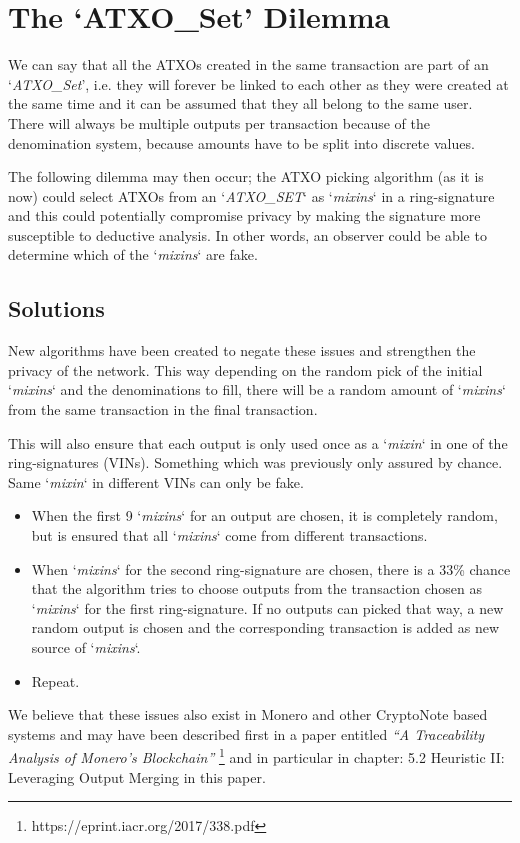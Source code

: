 \section{The ‘ATXO\_Set’ Dilemma}

We can say that all the ATXOs created in the same transaction are part 
of an ‘\textit{ATXO\_Set}’, i.e. they will forever be linked to each 
other as they were created at the same time and it can be assumed that 
they all belong to the same user. There will always be multiple outputs 
per transaction because of the denomination system, because amounts 
have to be split into discrete values. 



The following dilemma may then occur; the ATXO picking algorithm (as it is 
now) could select ATXOs from an ‘\textit{ATXO\_SET}‘ as ‘\textit{mixins}‘ 
in a ring-signature and this could potentially compromise privacy by making 
the signature more susceptible to deductive analysis. In other words, an 
observer could be able to determine which of the ‘\textit{mixins}‘ are fake. 



\subsection{Solutions}
New algorithms have been created to negate these issues and strengthen the 
privacy of the network. This way depending on the random pick of the initial
‘\textit{mixins}‘ and the denominations to fill, there will be a random 
amount of ‘\textit{mixins}‘ from the same transaction in the final transaction. 



This will also ensure that each output is only used once as a ‘\textit{mixin}‘ 
in one of the ring-signatures (VINs). Something which was previously only 
assured by chance. Same ‘\textit{mixin}‘ in different VINs can only be fake. 



\begin{itemize}
	\item When the first 9 ‘\textit{mixins}‘ for an output are chosen, it is 
	completely random, but is ensured that all ‘\textit{mixins}‘ come from 
	different transactions.
	\item When ‘\textit{mixins}‘ for the second ring-signature are chosen, 
	there is a 33\% chance that the algorithm tries to 	choose outputs from 
	the transaction chosen as ‘\textit{mixins}‘ for the first ring-signature. 
	If no outputs can 	picked that way, a new random output is chosen and 
	the corresponding transaction is added as new source of ‘\textit{mixins}‘.
	\item Repeat.
\end{itemize}



We believe that these issues also exist in Monero and other CryptoNote based 
systems and may have been described first in a paper entitled 
\textit{“A Traceability Analysis of Monero’s Blockchain”}
\footnote{https://eprint.iacr.org/2017/338.pdf} and in particular in 
chapter: 5.2 Heuristic II: Leveraging Output Merging in this paper.
